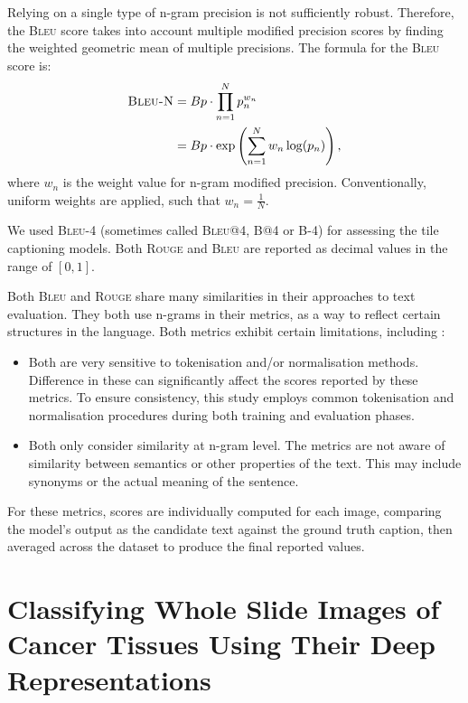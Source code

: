 \documentclass{l4proj}
\begin{document}
Relying on a single type of n-gram precision is not sufficiently robust. Therefore, the \textsc{Bleu} score takes into account multiple modified precision scores by finding the weighted geometric mean of multiple precisions. The formula for the \textsc{Bleu} score is:
\begin{equation}
\begin{split}
    \textsc{Bleu-N} &= Bp \cdot \prod_{n=1}^N p_n^{w_n} \\
                    &= Bp \cdot \exp\left(\sum_{n=1}^N w_n\log(p_n)\right),
\end{split}
\end{equation}
where $w_n$ is the weight value for n-gram modified precision. Conventionally, uniform weights are applied, such that $w_n = \frac{1}{N}$.

We used \textsc{Bleu-4} (sometimes called \textsc{Bleu@4}, \textsc{B@4} or \textsc{B-4}) for assessing the tile captioning models. Both \textsc{Rouge} and \textsc{Bleu} are reported as decimal values in the range of $[0, 1]$.

Both \textsc{Bleu} and \textsc{Rouge} share many similarities in their approaches to text evaluation. They both use n-grams in their metrics, as a way to reflect certain structures in the language. Both metrics exhibit certain limitations, including \citep{ananyaNLG}:
\begin{itemize}
    \item Both are very sensitive to tokenisation and/or normalisation methods. Difference in these can significantly affect the scores reported by these metrics. To ensure consistency, this study employs common tokenisation and normalisation procedures during both training and evaluation phases.
    \item Both only consider similarity at n-gram level. The metrics are not aware of similarity between semantics or other properties of the text. This may include synonyms or the actual meaning of the sentence.
\end{itemize}

For these metrics, scores are individually computed for each image, comparing the model's output as the candidate text against the ground truth caption, then averaged across the dataset to produce the final reported values.

\chapter{Classifying Whole Slide Images of Cancer Tissues Using Their Deep Representations} \label{sec:WSI}
\end{document}
